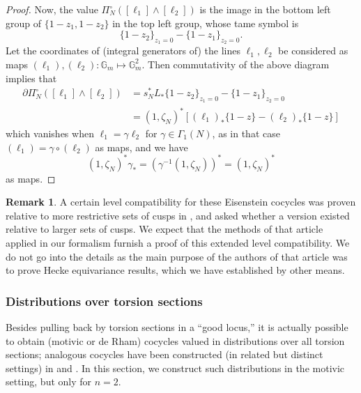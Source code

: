 \documentclass[10pt]{amsart}
\theoremstyle{definition}
\newtheorem{rem}[thm]{Remark}
\newcommand{\G}{\mathbb{G}}
\numberwithin{equation}{section}
\begin{document}
\begin{proof}
        Now, the value $\Pi_N^\circ([\ell_1]\wedge [\ell_2])$ is the image in the bottom left group of $\{1-z_1,1-z_2\}$ in the top left group, whose tame symbol is
        \[
        \{1-z_2\}_{z_1=0}-\{1-z_1\}_{z_2=0}.
        \]
        Let the coordinates of (integral generators of) the lines $\ell_1,\ell_2$ be considered as maps $(\ell_1),(\ell_2):\G_m\mapsto \G_m^2$. Then commutativity of the above diagram implies that 
        \begin{align}
        \partial \Pi_N^\circ([\ell_1]\wedge [\ell_2]) & = s_N^*L_* \{1-z_2\}_{z_1=0}-\{1-z_1\}_{z_2=0} \\
        & = (1,\zeta_N)^* [(\ell_1)_*\{1-z\} - (\ell_2)_*\{1-z\}]
        \end{align}
        which vanishes when $\ell_1=\gamma\ell_2$ for $\gamma \in \Gamma_1(N)$, as in that case $(\ell_1) = \gamma \circ (\ell_2)$ as maps, and we have 
        \[
        (1,\zeta_N)^*\gamma_* = (\gamma^{-1}(1,\zeta_N))^*=(1,\zeta_N)^*
        \]
        as maps.
    \end{proof}

    \begin{rem}
        A certain level compatibility for these Eisenstein cocycles was proven relative to more restrictive sets of cusps in \cite[Theorem 1.1]{LcW}, and asked whether a version existed relative to larger sets of cusps. We expect that the methods of that article applied in our formalism furnish a proof of this extended level compatibility. We do not go into the details as the main purpose of the authors of that article was to prove Hecke equivariance results, which we have established by other means.
    \end{rem}
    \subsubsection{Distributions over torsion sections}

    Besides pulling back by torsion sections in a ``good locus,'' it is actually possible to obtain (motivic or de Rham) cocycles valued in distributions over all torsion sections; analogous cocycles have been constructed (in related but distinct settings) in \cite{BPPS} and \cite{RX}. In this section, we construct such distributions in the motivic setting, but only for $n=2$.
\end{document}
